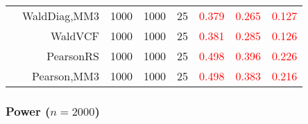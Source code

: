 \documentclass[
]{article}
\begin{document}
\begin{table}[H]
{\begin{tabular}[t]{lrrrrrrr}
\hspace{1em} & WaldDiag,MM3 & 1000 & 1000 & 25 & \textcolor{red}{0.379} & \textcolor{red}{0.265} & \textcolor{red}{0.127}\\

\hspace{1em} & WaldVCF & 1000 & 1000 & 25 & \textcolor{red}{0.381} & \textcolor{red}{0.285} & \textcolor{red}{0.126}\\

\hspace{1em} & PearsonRS & 1000 & 1000 & 25 & \textcolor{red}{0.498} & \textcolor{red}{0.396} & \textcolor{red}{0.226}\\

\hspace{1em} & Pearson,MM3 & 1000 & 1000 & 25 & \textcolor{red}{0.498} & \textcolor{red}{0.383} & \textcolor{red}{0.216}\\
\bottomrule
\end{tabular}}
\endgroup{}
\end{table}

\hypertarget{power-n2000}{%
\subsubsection{\texorpdfstring{Power
(\(n=2000\))}{Power (n=2000)}}\label{power-n2000}}
\end{document}

